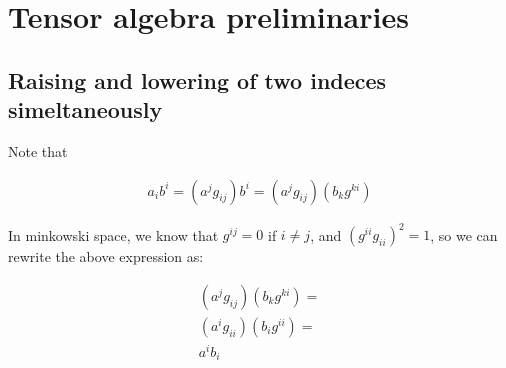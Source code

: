\chapter{Tensor algebra preliminaries}

\section{Raising and lowering of two indeces simeltaneously}

Note that 

\begin{align*}
a_i b^i = (a^j g_{ij}) b^i = (a^j g_{ij}) (b_k g^{ki})
\end{align*}

In minkowski space, we know that $g^{ij} = 0$ if $i \neq j$, and $(g^{ii} g_{ii})^2 = 1$,
so we can rewrite the above expression as:



\begin{align*}
(a^j g_{ij}) (b_k g^{ki}) = \\
(a^i g_{ii}) (b_i g^{ii}) = \\
a^i b_i
\end{align*}
